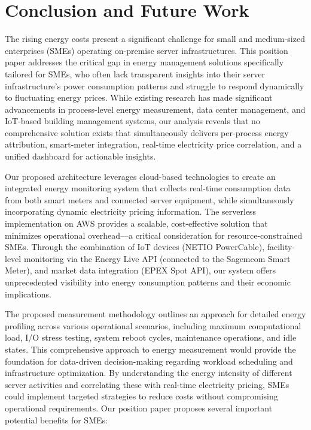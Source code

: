 


\section{Conclusion and Future Work}
The rising energy costs present a significant challenge for small and medium-sized enterprises (SMEs)
operating on-premise server infrastructures. This position paper addresses the critical gap in
energy management solutions specifically tailored for SMEs, who often lack transparent insights
into their server infrastructure's power consumption patterns and struggle to respond dynamically
to fluctuating energy prices. While existing research has made significant advancements in
process-level energy measurement, data center management, and IoT-based building management systems,
our analysis reveals that no comprehensive solution exists that simultaneously delivers
per-process energy attribution, smart-meter integration, real-time electricity price correlation,
and a unified dashboard for actionable insights.

Our proposed architecture leverages cloud-based technologies to create an integrated energy
monitoring system that collects real-time consumption data from both smart meters and connected
server equipment, while simultaneously incorporating dynamic electricity pricing information.
The serverless implementation on AWS provides a scalable, cost-effective solution that minimizes
operational overhead—a critical consideration for resource-constrained SMEs. Through the
combination of IoT devices (NETIO PowerCable), facility-level monitoring via the Energy Live API
(connected to the Sagemcom Smart Meter), and market data integration (EPEX Spot API), our system
offers unprecedented visibility into energy consumption patterns and their economic implications.

The proposed measurement methodology outlines an approach for detailed energy profiling across
various operational scenarios, including maximum computational load, I/O stress testing, system
reboot cycles, maintenance operations, and idle states. This comprehensive approach to energy
measurement would provide the foundation for data-driven decision-making regarding workload
scheduling and infrastructure optimization. By understanding the energy intensity of different
server activities and correlating these with real-time electricity pricing, SMEs could implement
targeted strategies to reduce costs without compromising operational requirements. Our position
paper proposes several important potential benefits for SMEs:

